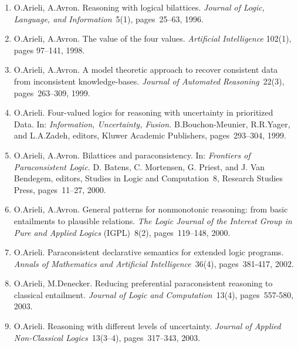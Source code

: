 \documentclass{article}
\begin{document}
\begin{enumerate}

    \item O.Arieli, A.Avron.
          Reasoning with logical bilattices. {\em Journal of Logic, Language, and Information\/}~5(1),
          pages~25--63, 1996.

    \item O.Arieli, A.Avron.
          The value of the four values. {\em Artificial Intelligence\/}
          102(1), pages 97--141, 1998.

    \item O.Arieli, A.Avron.
          A model theoretic approach to recover consistent data from
          inconsistent knowledge-bases. {\em Journal of Automated Reasoning\/}~22(3),
          pages~263--309, 1999.

    \item O.Arieli.
          Four-valued logics for reasoning with uncertainty in
          prioritized Data. In: {\em Information, Uncertainty, Fusion.\/}
          B.Bouchon-Meunier, R.R.Yager, and L.A.Zadeh, editors, Kluwer
          Academic Publishers, pages~293--304, 1999.

    \item O.Arieli, A.Avron.
          Bilattices and paraconsistency. In: {\em Frontiers of
          Paraconsistent Logic.\/} D. Batens, C. Mortensen, G. Priest, and
          J. Van Bendegem, editors, Studies in Logic and Computation~8,
          Research Studies Press, pages~11--27, 2000.

    \item O.Arieli, A.Avron.
          General patterns for nonmonotonic reasoning: from basic
          entailments to plausible relations. {\em The Logic Journal of
          the Interest Group in Pure and Applied Logics\/} (IGPL)~8(2),
          pages~119--148, 2000.

    \item O.Arieli.
          Paraconsistent declarative semantics for extended logic
          programs. {\em Annals of Mathematics and Artificial Intelligence\/}~36(4),
          pages~381-417, 2002.

    \item O.Arieli, M.Denecker.
          Reducing preferential paraconsistent reasoning to classical
          entailment. {\em Journal of Logic and Computation\/}~13(4),
          pages~557-580, 2003.

    \item O.Arieli.
          Reasoning with different levels of uncertainty.
          {\em Journal of Applied Non-Classical Logics\/}~13(3--4),
          pages~317--343, 2003.


\end{enumerate}
\end{document}

